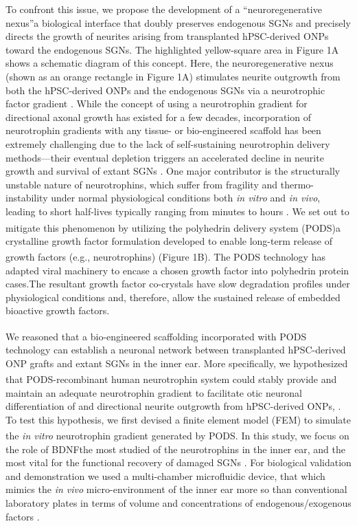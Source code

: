 \documentclass[review]{elsarticle}
\begin{document}
\indent To confront this issue, we propose the development of a “neuroregenerative nexus”\textemdash a biological interface that doubly preserves endogenous SGNs and precisely directs the growth of neurites arising from transplanted hPSC-derived ONPs toward the endogenous SGNs. The highlighted yellow-square area in Figure 1A shows a schematic diagram of this concept. Here, the neuroregenerative nexus (shown as an orange rectangle in Figure 1A) stimulates neurite outgrowth from both the hPSC-derived ONPs and the endogenous SGNs via a neurotrophic factor gradient \cite{Goodhill1998}. While the concept of using a neurotrophin gradient for directional axonal growth has existed for a few decades, incorporation of neurotrophin gradients with any tissue- or bio-engineered scaffold has been extremely challenging due to the lack of self-sustaining neurotrophin delivery methods—their eventual depletion triggers an accelerated decline in neurite growth and survival of extant SGNs \cite{Gillespie2003, Pettingill2008, Shepherd2009}. One major contributor is the structurally unstable nature of neurotrophins, which suffer from fragility and thermo-instability under normal physiological conditions both \textit{in vitro} and \textit{in vivo}, leading to short half-lives typically ranging from minutes to hours \cite{Baseri2012}. We set out to mitigate this phenomenon by utilizing the polyhedrin delivery system (PODS\textsuperscript{\textregistered})\textemdash a crystalline growth factor formulation developed to enable long-term release of growth factors (e.g., neurotrophins) \cite{Ikeda2001a,Suzuki1997,Mori1993} (Figure 1B). The PODS\textsuperscript{\textregistered} technology has adapted viral machinery to encase a chosen growth factor into polyhedrin protein cases.The resultant growth factor co-crystals have slow degradation profiles under physiological conditions and, therefore, allow the sustained release of embedded bioactive growth factors.  

\indent We reasoned that a bio-engineered scaffolding incorporated with PODS\textsuperscript{\textregistered} technology can establish a neuronal network between transplanted hPSC-derived ONP grafts and extant SGNs in the inner ear. More specifically, we hypothesized that PODS\textsuperscript{\textregistered}-recombinant human neurotrophin system could stably provide and maintain an adequate neurotrophin gradient to facilitate otic neuronal differentiation of and directional neurite outgrowth from hPSC-derived ONPs, . To test this hypothesis, we first devised a finite element model (FEM) to simulate the \textit{in vitro} neurotrophin gradient generated by PODS\textsuperscript{\textregistered}. In this study, we focus on the role of BDNF\textemdash the most studied of the neurotrophins in the inner ear, and the most vital for the functional recovery of damaged SGNs \cite{green2012}. For biological validation and demonstration we used a multi-chamber microfluidic device, that which mimics the \textit{in vivo} micro-environment of the inner ear more so than conventional laboratory plates in terms of volume and concentrations of endogenous/exogenous factors \cite{Meyvantsson2008}. 
\end{document}

